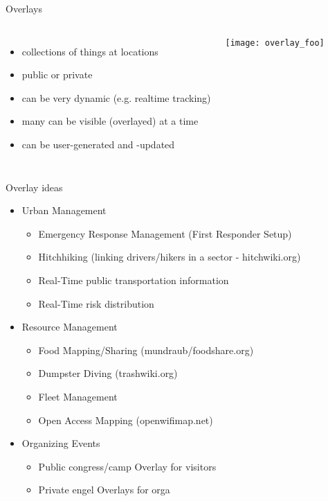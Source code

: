 \documentclass{beamer}
\begin{document}
\begin{frame}{Overlays}
 \begin{columns}
   \begin{itemize}
    \item collections of things at locations
    \item public or private
    \item can be very dynamic (e.g. realtime tracking)
    \item many can be visible (overlayed) at a time
    \item can be user-generated and -updated
   \end{itemize}
   \texttt{[image: overlay\_foo]}
 \end{columns}
\end{frame}

\begin{frame}{Overlay ideas}{}
 \begin{itemize}
  \item Urban Management
   \begin{itemize}
    \item Emergency Response Management (First Responder Setup)
    \item Hitchhiking (linking drivers/hikers in a sector - hitchwiki.org)
    \item Real-Time public transportation information
    \item Real-Time risk distribution
   \end{itemize}
  \item Resource Management
   \begin{itemize}
    \item Food Mapping/Sharing (mundraub/foodshare.org)
    \item Dumpster Diving (trashwiki.org)
    \item Fleet Management
    \item Open Access Mapping (openwifimap.net)
   \end{itemize}
  \item Organizing Events
   \begin{itemize}
    \item Public congress/camp Overlay for visitors
    \item Private engel Overlays for orga
   \end{itemize}

 \end{itemize}
\end{frame}
\end{document}
